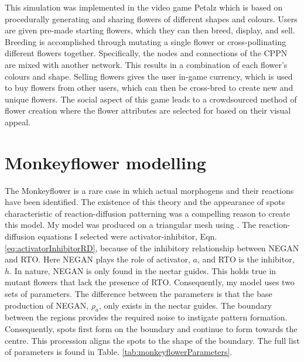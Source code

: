 This simulation was implemented in the video game Petalz which is based on procedurally generating and sharing flowers of different shapes and colours. Users are given pre-made starting flowers, which they can then breed, display, and sell. Breeding is accomplished through mutating a single flower or cross-pollinating different flowers together. Specifically, the nodes and connections of the CPPN are mixed with another network. This results in a combination of each flower's colours and shape. Selling flowers gives the user in-game currency, which is used to buy flowers from other users, which can then be cross-bred to create new and unique flowers. The social aspect of this game leads to a crowdsourced method of flower creation where the flower attributes are selected for based on their visual appeal.

\section{Monkeyflower modelling}
The Monkeyflower is a rare case in which actual morphogens and their reactions have been identified. The existence of this theory and the appearance of spots characteristic of reaction-diffusion patterning was a compelling reason to create this model. My model was produced on a triangular mesh using \ProgramName{}. The reaction-diffusion equations I selected were activator-inhibitor, Eqn. \eqref{eq:activatorInhibitorRD}, because of the inhibitory relationship between NEGAN and RTO. Here NEGAN plays the role of activator, $a$, and RTO is the inhibitor, $h$. In nature, NEGAN is only found in the nectar guides. This holds true in mutant flowers that lack the presence of RTO. Consequently, my model uses two sets of parameters. The difference between the parameters is that the base production of NEGAN, $\rho_a$, only exists in the nectar guides. The boundary between the regions provides the required noise to instigate pattern formation. Consequently, spots first form on the boundary and continue to form towards the centre. This procession aligns the spots to the shape of the boundary. The full list of parameters is found in Table. \ref{tab:monkeyflowerParameters}.

\begin{table}[ht]
	\centering
	\caption {Parameters for the monkeyflower model using activator-inhibitor equations (Eqn. \ref{eq:activatorInhibitorRD}). Values in parentheses are used at the periphery. The initial morphogen distribution has NEGAN $= 0$ and RTO $= 1$ everywhere.}
	\label{tab:monkeyflowerParameters}
\end{table}

